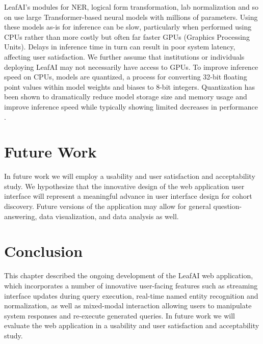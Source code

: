 \documentclass[../main.tex]{subfiles}
\begin{document}
LeafAI's modules for NER, logical form transformation, lab normalization and so on use large Transformer-based neural models \cite{vaswani2017attention} with millions of parameters. Using these models as-is for inference can be slow, particularly when performed using CPUs rather than more costly but often far faster GPUs (Graphics Processing Units). Delays in inference time in turn can result in poor system latency, affecting user satisfaction. We further assume that institutions or individuals deploying LeafAI may not necessarily have access to GPUs. To improve inference speed on CPUs, models are quantized, a process for converting 32-bit floating point values within model weights and biases to 8-bit integers. Quantization has been shown to dramatically reduce model storage size and memory usage and improve inference speed while typically showing limited decreases in performance \cite{hubara2017quantized}. 

\section{Future Work}

In future work we will employ a usability and user satisfaction and acceptability study. We hypothesize that the innovative design of the web application user interface will represent a meaningful advance in user interface design for cohort discovery. Future versions of the application may allow for general question-answering, data visualization, and data analysis as well.

\section{Conclusion}

This chapter described the ongoing development of the LeafAI web application, which incorporates a number of innovative user-facing features such as streaming interface updates during query execution, real-time named entity recognition and normalization, as well as mixed-modal interaction allowing users to manipulate system responses and re-execute generated queries. In future work we will evaluate the web application in a usability and user satisfaction and acceptability study.
\end{document}

